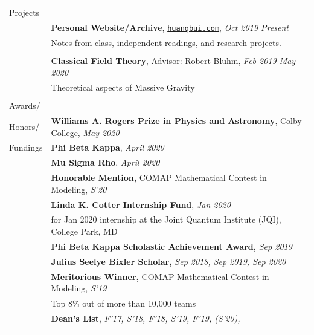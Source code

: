 \documentclass[10pt]{article}
\begin{document}
\begin{longtable}{ l p{14.7cm}   }
	
	\large{Projects}		& \\ 
	& \textbf{Personal Website/Archive}, %
	\href{https://huanqbui.com}{\texttt{huanqbui.com}}, \textit{Oct 2019 \textendash Present} \\
	& Notes from class, independent readings, and research projects.\\
	& \\
		
	
	& \textbf{Classical Field Theory}, Advisor: Robert Bluhm, \textit{Feb 2019 \textendash May 2020}\\
	& Theoretical aspects of Massive Gravity\\
	& \\

     					
     					



\large{Awards/}    	& \\
\large{Honors/}		& \textbf{Williams A. Rogers Prize in Physics and Astronomy}, Colby College, \textit{May 2020} \\
\large{Fundings}	& \textbf{Phi Beta Kappa}, \textit{April 2020} \\
& \textbf{Mu Sigma Rho}, \textit{April 2020}\\
& \textbf{Honorable Mention,}  COMAP Mathematical Contest in Modeling, \textit{S'20}\\
& \textbf{Linda K. Cotter Internship Fund}, \textit{Jan 2020}\\
& for Jan 2020 internship at the Joint Quantum Institute (JQI), College Park, MD\\
& \textbf{Phi Beta Kappa Scholastic Achievement Award,} \textit{Sep 2019}\\
& \textbf{Julius Seelye Bixler Scholar,} \textit{Sep 2018, Sep 2019, Sep 2020}\\
& \textbf{Meritorious Winner,}  COMAP Mathematical Contest in Modeling, \textit{S'19}\\
& Top 8\% out of more than 10,000 teams\\
& \textbf{Dean’s List}, \textit{F'17, S'18, F'18, S'19, F'19, (S'20), }\\
&\\
		

\end{longtable}
\end{document}
